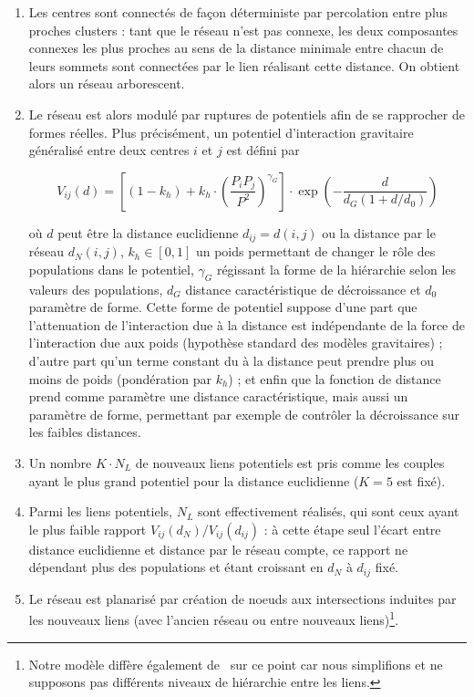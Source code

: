 {\begin{enumerate}
\item Les centres sont connectés de façon déterministe par percolation entre plus proches clusters : tant que le réseau n'est pas connexe, les deux composantes connexes les plus proches au sens de la distance minimale entre chacun de leurs sommets sont connectées par le lien réalisant cette distance. On obtient alors un réseau arborescent.
\item Le réseau est alors modulé par ruptures de potentiels afin de se rapprocher de formes réelles. Plus précisément, un potentiel d'interaction gravitaire généralisé entre deux centres $i$ et $j$ est défini par

\[
V_{ij}(d) = \left[ (1 - k_h) + k_h \cdot \left( \frac{P_i P_j}{P^2} \right)^{\gamma_G} \right]\cdot \exp{\left( -\frac{d}{d_G (1 + d/d_0)} \right)}
\]

où $d$ peut être la distance euclidienne $d_{ij}=d(i,j)$ ou la distance par le réseau $d_N(i,j)$, $k_h \in [0,1]$ un poids permettant de changer le rôle des populations dans le potentiel, $\gamma_G$ régissant la forme de la hiérarchie selon les valeurs des populations, $d_G$ distance caractéristique de décroissance et $d_0$ paramètre de forme. Cette forme de potentiel suppose d'une part que l'attenuation de l'interaction due à la distance est indépendante de la force de l'interaction due aux poids (hypothèse standard des modèles gravitaires) ; d'autre part qu'un terme constant du à la distance peut prendre plus ou moins de poids (pondération par $k_h$) ; et enfin que la fonction de distance prend comme paramètre une distance caractéristique, mais aussi un paramètre de forme, permettant par exemple de contrôler la décroissance sur les faibles distances.
\item Un nombre $K\cdot N_L$ de nouveaux liens potentiels est pris comme les couples ayant le plus grand potentiel pour la distance euclidienne ($K=5$ est fixé).
\item Parmi les liens potentiels, $N_L$ sont effectivement réalisés, qui sont ceux ayant le plus faible rapport $V_{ij}(d_N)/V_{ij}(d_{ij})$ : à cette étape seul l'écart entre distance euclidienne et distance par le réseau compte, ce rapport ne dépendant plus des populations et étant croissant en $d_N$ à $d_{ij}$ fixé.
\item Le réseau est planarisé par création de noeuds aux intersections induites par les nouveaux liens (avec l'ancien réseau ou entre nouveaux liens)\footnote{Notre modèle diffère également de~\cite{schmitt2014modelisation} sur ce point car nous simplifions et ne supposons pas différents niveaux de hiérarchie entre les liens.}.
\end{enumerate}
}


